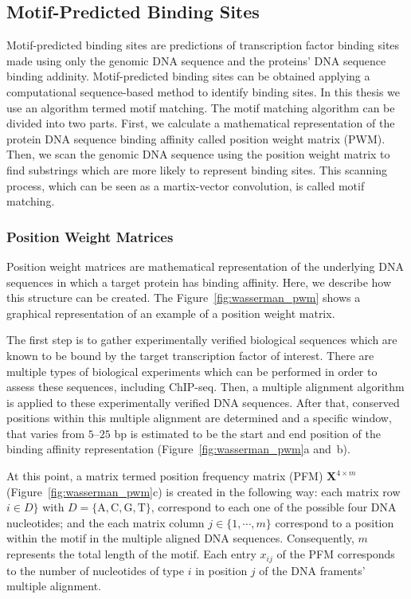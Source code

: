 \subsection{Motif-Predicted Binding Sites}
\label{sec:motif.predicted.binding.sites}

Motif-predicted binding sites are predictions of transcription factor binding sites made using only the genomic DNA sequence and the proteins' DNA sequence binding addinity. Motif-predicted binding sites can be obtained applying a computational sequence-based method to identify binding sites. In this thesis we use an algorithm termed motif matching. The motif matching algorithm can be divided into two parts. First, we calculate a mathematical representation of the protein DNA sequence binding affinity called position weight matrix (PWM). Then, we scan the genomic DNA sequence using the position weight matrix to find substrings which are more likely to represent binding sites. This scanning process, which can be seen as a martix-vector convolution, is called motif matching.

\subsubsection{Position Weight Matrices}

Position weight matrices are mathematical representation of the underlying DNA sequences in which a target protein has binding affinity. Here, we describe how this structure can be created. The Figure~\ref{fig:wasserman_pwm} shows a graphical representation of an example of a position weight matrix.

The first step is to gather experimentally verified biological sequences which are known to be bound by the target transcription factor of interest. There are multiple types of biological experiments which can be performed in order to assess these sequences, including ChIP-seq. Then, a multiple alignment algorithm is applied to these experimentally verified DNA sequences. After that, conserved positions within this multiple alignment are determined and a specific window, that varies from $5$--$25$ bp is estimated to be the start and end position of the binding affinity representation (Figure~\ref{fig:wasserman_pwm}a and~b).

At this point, a matrix termed position frequency matrix (PFM) $\mathbf{X}^{4 \times m}$ (Figure~\ref{fig:wasserman_pwm}c) is created in the following way: each matrix row $i \in D\}$ with $D = \{\text{A},\text{C},\text{G},\text{T}\}$, correspond to each one of the possible four DNA nucleotides; and the each matrix column $ j \in \{1, \cdots, m\} $ correspond to a position within the motif in the multiple aligned DNA sequences. Consequently, $m$ represents the total length of the motif. Each entry $x_{ij}$ of the PFM corresponds to the number of nucleotides of type $ i $ in position $ j $ of the DNA framents' multiple alignment.

